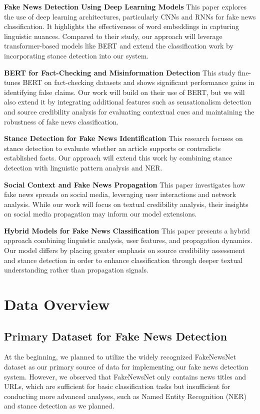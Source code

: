 \documentclass[11pt,a4paper]{article}
\begin{document}
\textbf{Fake News Detection Using Deep Learning Models} \cite{hu2022deep}
This paper explores the use of deep learning architectures, particularly CNNs and RNNs for fake news classification. It highlights the effectiveness of word embeddings in capturing linguistic nuances. 
Compared to their study, our approach will leverage transformer-based models like BERT and extend the classification work by incorporating stance detection into our system.

\textbf{BERT for Fact-Checking and Misinformation Detection} \cite{anggrainingsih2025evaluating}
This study fine-tunes BERT on fact-checking datasets and shows significant performance gains in identifying false claims. 
Our work will build on their use of BERT, but we will also extend it by integrating additional features such as sensationalism detection and source credibility analysis for evaluating contextual cues and maintaining the robustness of fake news classification.

\textbf{Stance Detection for Fake News Identification} \cite{li2022brief}
This research focuses on stance detection to evaluate whether an article supports or contradicts established facts. 
Our approach will extend this work by combining stance detection with linguistic pattern analysis and NER.

\textbf{Social Context and Fake News Propagation} \cite{chen2025enhancing}
This paper investigates how fake news spreads on social media, leveraging user interactions and network analysis. 
While our work will focus on textual credibility analysis, their insights on social media propagation may inform our model extensions.

\textbf{Hybrid Models for Fake News Classification} \cite{mostafa2024modality}
This paper presents a hybrid approach combining linguistic analysis, user features, and propagation dynamics. 
Our model differs by placing greater emphasis on source credibility assessment and stance detection in order to enhance classification through deeper textual understanding rather than propagation signals.


\section{Data Overview}

\subsection{Primary Dataset for Fake News Detection}
At the beginning, we planned to utilize the widely recognized FakeNewsNet dataset \cite{shu2018fakenewsnet, shu2017fake, shu2017exploiting} as our primary source of data for implementing our fake news detection system. However, we observed that FakeNewsNet only contains news titles and URLs, which are sufficient for basic classification tasks but insufficient for conducting more advanced analyses, such as Named Entity Recognition (NER) and stance detection as we planned.
\end{document}
